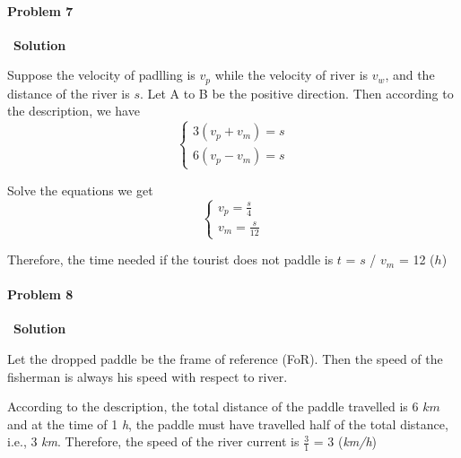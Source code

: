 \documentclass[12pt,a4paper]{article}
\begin{document}
\paragraph{\large \textbf{Problem 7}}~{\textbf{Solution}}
\vspace{2mm}
\par Suppose the velocity of padlling is $v_p$ while the velocity of river is $v_w$, and the distance of the river is $s$. Let A to B be the positive direction. Then according to the description, we have
\begin{equation*}
	\begin{cases}
		3(v_p+v_m) = s\\
		6(v_p-v_m) = s
	\end{cases}
\end{equation*}
\par Solve the equations we get
\begin{equation*}
	\begin{cases}
		v_p = \frac{s}{4}\\
		v_m = \frac{s}{12}
	\end{cases}
\end{equation*}
\par Therefore, the time needed if the tourist does not paddle is $t$ = $s$ / $v_m$ = 12 ($h$)

\paragraph{\large \textbf{Problem 8}}~{\textbf{Solution}}
\vspace{2mm}
\par Let the dropped paddle be the frame of reference (FoR). Then the speed of the fisherman is always his speed with respect to river.
\par According to the description, the total distance of the paddle travelled is 6 $km$ and at the time of 1 \textit{h}, the paddle must have travelled half of the total distance, i.e., 3 \textit{km}. Therefore, the speed of the river current is $\frac{3}{1}$ = 3 (\textit{km/h})
\end{document}
